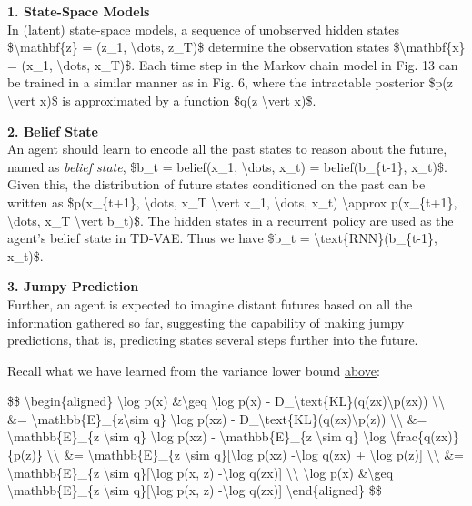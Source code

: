 \textbf{1. State-Space Models}\\
In (latent) state-space models, a sequence of unobserved hidden states \$\textbackslash mathbf\{z\} = (z\_1, \textbackslash dots, z\_T)\$ determine the observation states \$\textbackslash mathbf\{x\} = (x\_1, \textbackslash dots, x\_T)\$. Each time step in the Markov chain model in Fig. 13 can be trained in a similar manner as in Fig. 6, where the intractable posterior \$p(z \textbackslash vert x)\$ is approximated by a function \$q(z \textbackslash vert x)\$.

\textbf{2. Belief State}\\
An agent should learn to encode all the past states to reason about the future, named as \emph{belief state}, \$b\_t = belief(x\_1, \textbackslash dots, x\_t) = belief(b\_\{t-1\}, x\_t)\$. Given this, the distribution of future states conditioned on the past can be written as \$p(x\_\{t+1\}, \textbackslash dots, x\_T \textbackslash vert x\_1, \textbackslash dots, x\_t) \textbackslash approx p(x\_\{t+1\}, \textbackslash dots, x\_T \textbackslash vert b\_t)\$. The hidden states in a recurrent policy are used as the agent's belief state in TD-VAE. Thus we have \$b\_t = \textbackslash text\{RNN\}(b\_\{t-1\}, x\_t)\$.

\textbf{3. Jumpy Prediction}\\
Further, an agent is expected to imagine distant futures based on all the information gathered so far, suggesting the capability of making jumpy predictions, that is, predicting states several steps further into the future.

Recall what we have learned from the variance lower bound \hyperref[loss-function-elbo]{above}:

\$\$ \textbackslash begin\{aligned\} \textbackslash log p(x) \&\textbackslash geq \textbackslash log p(x) - D\_\textbackslash text\{KL\}(q(z\textbar x)\textbackslash\textbar p(z\textbar x)) \textbackslash\textbackslash{} \&= \textbackslash mathbb\{E\}\_\{z\textbackslash sim q\} \textbackslash log p(x\textbar z) - D\_\textbackslash text\{KL\}(q(z\textbar x)\textbackslash\textbar p(z)) \textbackslash\textbackslash{} \&= \textbackslash mathbb\{E\}\_\{z \textbackslash sim q\} \textbackslash log p(x\textbar z) - \textbackslash mathbb\{E\}\_\{z \textbackslash sim q\} \textbackslash log \textbackslash frac\{q(z\textbar x)\}\{p(z)\} \textbackslash\textbackslash{} \&= \textbackslash mathbb\{E\}\_\{z \textbackslash sim q\}{[}\textbackslash log p(x\textbar z) -\textbackslash log q(z\textbar x) + \textbackslash log p(z){]} \textbackslash\textbackslash{} \&= \textbackslash mathbb\{E\}\_\{z \textbackslash sim q\}{[}\textbackslash log p(x, z) -\textbackslash log q(z\textbar x){]} \textbackslash\textbackslash{} \textbackslash log p(x) \&\textbackslash geq \textbackslash mathbb\{E\}\_\{z \textbackslash sim q\}{[}\textbackslash log p(x, z) -\textbackslash log q(z\textbar x){]} \textbackslash end\{aligned\} \$\$

